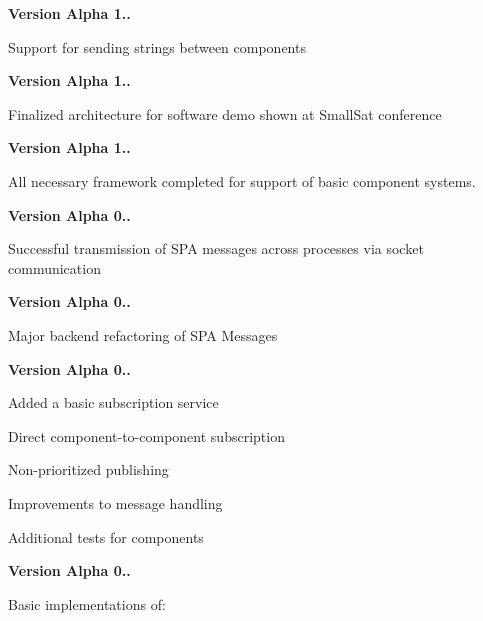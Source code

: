 \begin{DoxyItemize}
\item {\bfseries Version Alpha 1..}
\begin{DoxyItemize}
\item Support for sending strings between components
\end{DoxyItemize}
\item {\bfseries Version Alpha 1..}
\begin{DoxyItemize}
\item Finalized architecture for software demo shown at Small\+Sat conference
\end{DoxyItemize}
\item {\bfseries Version Alpha 1..}
\begin{DoxyItemize}
\item All necessary framework completed for support of basic component systems.
\end{DoxyItemize}
\item {\bfseries Version Alpha 0..}
\begin{DoxyItemize}
\item Successful transmission of S\+PA messages across processes via socket communication
\end{DoxyItemize}
\item {\bfseries Version Alpha 0..}
\begin{DoxyItemize}
\item Major backend refactoring of S\+PA Messages
\end{DoxyItemize}
\item {\bfseries Version Alpha 0..}
\begin{DoxyItemize}
\item Added a basic subscription service
\begin{DoxyItemize}
\item Direct component-\/to-\/component subscription
\item Non-\/prioritized publishing
\end{DoxyItemize}
\item Improvements to message handling
\item Additional tests for components
\end{DoxyItemize}
\item {\bfseries Version Alpha 0..}
\begin{DoxyItemize}
\item Basic implementations of\+:
\begin{DoxyItemize}

\end{DoxyItemize}
\end{DoxyItemize}
\end{DoxyItemize}

